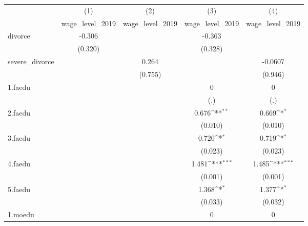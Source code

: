 {
\def\sym#1{\ifmmode^{#1}\else\(^{#1}\)\fi}
\begin{tabular}{l*{4}{c}}
\hline\hline
            &\multicolumn{1}{c}{(1)}&\multicolumn{1}{c}{(2)}&\multicolumn{1}{c}{(3)}&\multicolumn{1}{c}{(4)}\\
            &\multicolumn{1}{c}{wage\_level\_2019}&\multicolumn{1}{c}{wage\_level\_2019}&\multicolumn{1}{c}{wage\_level\_2019}&\multicolumn{1}{c}{wage\_level\_2019}\\
\hline
divorce     &      -0.306         &                     &      -0.363         &                     \\
            &     (0.320)         &                     &     (0.328)         &                     \\
[1em]
severe\_divorce&                     &       0.264         &                     &     -0.0607         \\
            &                     &     (0.755)         &                     &     (0.946)         \\
[1em]
1.faedu     &                     &                     &           0         &           0         \\
            &                     &                     &         (.)         &         (.)         \\
[1em]
2.faedu     &                     &                     &       0.676\sym{**} &       0.669\sym{*}  \\
            &                     &                     &     (0.010)         &     (0.010)         \\
[1em]
3.faedu     &                     &                     &       0.720\sym{*}  &       0.719\sym{*}  \\
            &                     &                     &     (0.023)         &     (0.023)         \\
[1em]
4.faedu     &                     &                     &       1.481\sym{***}&       1.485\sym{***}\\
            &                     &                     &     (0.001)         &     (0.001)         \\
[1em]
5.faedu     &                     &                     &       1.368\sym{*}  &       1.377\sym{*}  \\
            &                     &                     &     (0.033)         &     (0.032)         \\
[1em]
1.moedu     &                     &                     &           0         &           0         \\

\end{tabular}}
